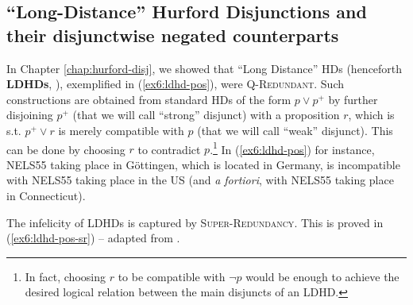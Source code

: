 \subsection{``Long-Distance'' Hurford Disjunctions and their disjunctwise negated counterparts}

In Chapter \ref{chap:hurford-disj}, we showed that ``Long Distance'' HDs (henceforth \textbf{LDHDs}, ), exemplified in (\ref{ex6:ldhd-pos}), were \textsc{Q-Redundant}. Such constructions are obtained from standard HDs of the form $p \vee p^+$ by further disjoining $p^+$ (that we will call ``strong'' disjunct) with a proposition $r$, which is s.t. $p^+ \vee r$ is merely compatible with $p$ (that we will call ``weak'' disjunct). This can be done by choosing $r$ to contradict $p$.\footnote{In fact, choosing $r$ to be compatible with $\neg p$ would be enough to achieve the desired logical relation between the main disjuncts of an LDHD.} In (\ref{ex6:ldhd-pos}) for instance, NELS55 taking place in Göttingen, which is located in Germany, is incompatible with NELS55 taking place in the US (and \textit{a fortiori}, with NELS55 taking place in Connecticut).

\begin{exe}
	\ex\label{ex6:ldhd-pos}
	\begin{xlist}
		\label{ex6:ldhd-pos-ws}
		\label{ex6:ldhd-pos-sw}
	\end{xlist}
\end{exe}

The infelicity of LDHDs is captured by \textsc{Super-Redundancy}. This is proved in (\ref{ex6:ldhd-pos-sr}) -- adapted from \citet{Kalomoiros2024}.

